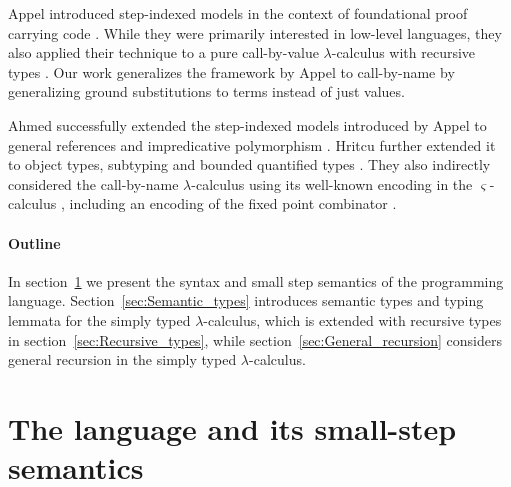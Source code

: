 \documentclass[10pt,a4paper,final,twocolumn]{article}
\theoremstyle{definition}
\theoremstyle{plain}
\begin{document}
Appel \ETAL introduced step-indexed models in the context of foundational proof carrying code \cite{AppelFelty00}.
While they were primarily interested in low-level languages, they also applied their technique to a pure
call-by-value $\lambda$-calculus with recursive types \cite{AppelMcAllester01}. Our work generalizes the framework
by Appel \ETAL to call-by-name by generalizing ground substitutions to terms instead of just values.

Ahmed \ETAL successfully extended the step-indexed models introduced by Appel \ETAL to general references
and impredicative polymorphism \cite{Ahmed04,AhmedAppelVirga02}. Hritcu \ETAL further extended it to object types,
subtyping and bounded quantified types \cite{Hritcu07,HritcuSchwinghammer09}. They also indirectly considered the
call-by-name $\lambda$-calculus using its well-known encoding in the $\varsigma$-calculus \cite{AbadiCardelli96},
including an encoding of the fixed point combinator \cite{Fisher94}.


\paragraph{Outline}
\label{par:Outline}


In section~\ref{sec:The_language_and_its_small_step_semantics} we present the syntax and small step
semantics of the programming language. Section~\ref{sec:Semantic_types} introduces semantic types
and typing lemmata for the simply typed $\lambda$-calculus, which is extended with recursive types in
section~\ref{sec:Recursive_types}, while section~\ref{sec:General_recursion} considers general recursion
in the simply typed $\lambda$-calculus.


\section{The language and its small-step semantics}
\label{sec:The_language_and_its_small_step_semantics}
\end{document}
